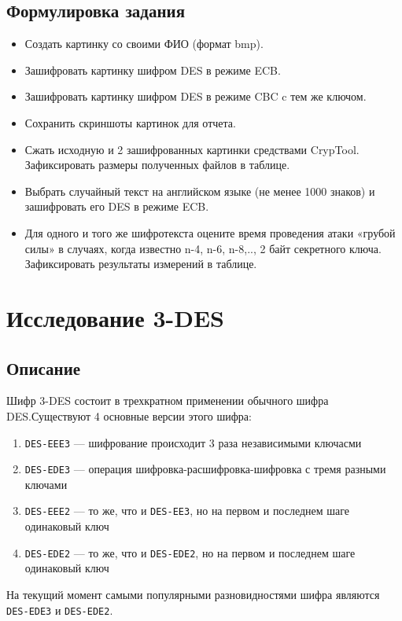 \documentclass[a4paper, 14pt]{extarticle}
\begin{document}
\subsection{Формулировка задания}
\begin{itemize}
    \item Создать картинку со своими ФИО (формат bmp).
    \item Зашифровать картинку шифром DES в режиме ECB.\@
    \item Зашифровать картинку шифром DES в режиме CBC c тем же ключом.
    \item Сохранить скриншоты картинок для отчета.
    \item Сжать исходную и 2 зашифрованных картинки средствами CrypTool. Зафиксировать размеры полученных файлов в таблице.
    \item Выбрать случайный текст на английском языке (не менее 1000 знаков) и зашифровать его DES в режиме ECB.\@
    \item Для одного и того же шифротекста оцените время проведения атаки «грубой силы» в случаях, когда известно n-4, n-6, n-8,.., 2 байт секретного ключа. Зафиксировать результаты измерений в таблице.
\end{itemize}

\section{Исследование 3-DES}
\subsection{Описание}
Шифр 3-DES состоит в трехкратном применении обычного шифра DES.\@ Существуют 4 основные версии этого шифра:
\begin{enumerate}
    \item \texttt{DES-EEE3} --- шифрование происходит 3 раза независимыми ключасми
    \item \texttt{DES-EDE3} --- операция шифровка-расшифровка-шифровка с тремя разными ключами
    \item \texttt{DES-EEE2} --- то же, что и \texttt{DES-EE3}, но на первом и последнем шаге одинаковый ключ
    \item \texttt{DES-EDE2} --- то же, что и \texttt{DES-EDE2}, но на первом и последнем шаге одинаковый ключ\\
\end{enumerate}
На текущий момент самыми популярными разновидностями шифра являются \texttt{DES-EDE3} и \texttt{DES-EDE2}.  
\end{document}
